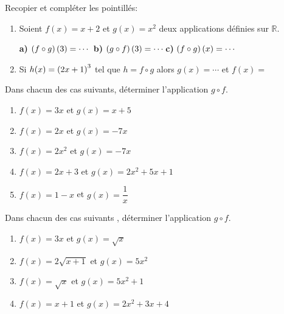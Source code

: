 



	\begin{exercice}
Recopier et compléter  les pointillés:
\begin{enumerate}
\item Soient  $ f(x)=x+2$ et $ g(x)=x^2$ deux applications définies sur $ \mathbb{R} $.

\medskip
\textbf{a)\;} $\left(f \circ g\right)(3)=\cdots$ \hspace*{1cm}\textbf{b)\;}
$\left(g \circ f\right)(3) =\cdots$\hspace*{1cm}\textbf{c)\;}
$\left(f \circ g\right)(x) =\cdots$
\item    Si \; $ h(x)=\left(2x+1\right)^3 $ \; tel que $ h=f\circ g $ alors \;  $ g(x)= \cdots $ \; et $ f(x)= $
\end{enumerate}
\end{exercice}
\begin{exercice}
Dans chacun des cas suivants, déterminer l'application  $ g\circ f $.

\begin{enumerate}
\item  $ f(x)= 3x $ \; et\; $ g(x)=x+5 $


\item  $ f(x)= 2x $ \; et \; $ g(x)=-7x $


\item  $ f(x)= 2x^{2} $ \; et \; $ g(x)=-7x $


\item $ f(x)= 2x+3 $ \; et\; $ g(x)=2x^{2}+5x+1 $


\item $ f(x)= 1-x $ \;  et  \;$ g(x)=\dfrac{1}{x} $

\end{enumerate}

\end{exercice}



\begin{exercice}
 Dans chacun des cas suivants , déterminer l'application  $ g\circ f $.

\begin{enumerate}
\item  $ f(x)= 3x $ \; et \;$ g(x)=\sqrt{x} $


\item $ f(x)= 2\sqrt{x+1} $ \; et\;  $ g(x)=5x^{2} $


\item $ f(x)= \sqrt{x} $ \; et\;  $ g(x)=5x^{2}+1 $


\item $ f(x)= x+1 $\;  et  \; $ g(x)=2x^{2} +3x+4$

\end{enumerate}

\end{exercice}



